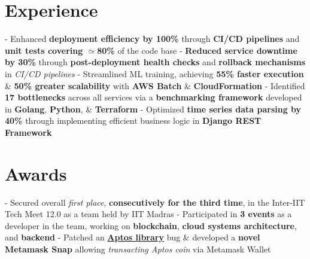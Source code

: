 \documentclass[a4paper,10pt]{extarticle} %
\begin{document}
\section{\textcolor{primary}{Experience}}
\vspace{+0.1cm}
\begin{description}[style=nextline, font=$\bullet$\hspace{2mm}\normalsize]

\item[\textbf{Software Engineering Intern | {\href{https://awsmo.ai/}{AWSMO}}}\hfill{April '24 - Present}]

- Enhanced \textbf{deployment efficiency by 100\%} through \textbf{CI/CD pipelines} and \textbf{unit tests covering $\simeq$80\%} of the code base \newline
- \textbf{Reduced service downtime by 30\%} through \textbf{post-deployment health checks} and \textbf{rollback mechanisms} in \textit{CI/CD pipelines} \newline
- Streamlined ML training, achieving \textbf{55\% faster execution} \& \textbf{50\% greater scalability} with \textbf{AWS Batch} \& \textbf{CloudFormation} \newline
- Identified \textbf{17 bottlenecks} across all services via a \textbf{benchmarking framework} developed in \textbf{Golang}, \textbf{Python}, \& \textbf{Terraform} \newline
- Optimized \textbf{time series data parsing by 40\%} through implementing efficient business logic in \textbf{Django REST Framework}

\end{description}

 \vspace{-0.1cm}
\section{\textcolor{primary}{Awards}}
 \vspace{0.1cm}
\begin{description}[style=nextline, font=$\bullet$\hspace{2mm}\normalsize]

 \item[{\href{https://interiit-tech.org/}{Inter-IIT Tech Meet 12.0}} | Contingent Gold ] 
- Secured overall \textit{first place}, \textbf{consecutively for the third time}, in the Inter-IIT Tech Meet 12.0 as a team held by IIT Madras \newline
- Participated in \textbf{3 events} as a developer in the team, working on \textbf{blockchain}, \textbf{cloud systems architecture}, and \textbf{backend} \newline
- Patched an \href{https://github.com/aptos-labs/aptos-core}{\textbf{Aptos library}} bug \& developed a \textbf{novel Metamask Snap} allowing \textit{transacting Aptos coin} via Metamask Wallet
\end{description}
\end{document}
